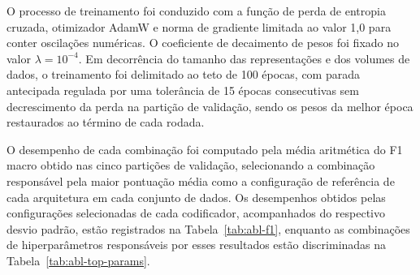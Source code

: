 O processo de treinamento foi conduzido com a função de perda de entropia cruzada, otimizador AdamW e norma de gradiente limitada ao valor 1,0 para conter oscilações numéricas. O coeficiente de decaimento de pesos foi fixado no valor $\lambda = 10^{-4}$. Em decorrência do tamanho das representações e dos volumes de dados, o treinamento foi delimitado ao teto de 100 épocas, com parada antecipada regulada por uma tolerância de 15 épocas consecutivas sem decrescimento da perda na partição de validação, sendo os pesos da melhor época restaurados ao término de cada rodada.

\label{subsec:res-codificadores}
\label{subsec:res-top-selecionadas}
O desempenho de cada combinação foi computado pela média aritmética do F1 macro obtido nas cinco partições de validação, selecionando a combinação responsável pela maior pontuação média como a configuração de referência de cada arquitetura em cada conjunto de dados. Os desempenhos obtidos pelas configurações selecionadas de cada codificador, acompanhados do respectivo desvio padrão, estão registrados na Tabela~\ref{tab:abl-f1}, enquanto as combinações de hiperparâmetros responsáveis por esses resultados estão discriminadas na Tabela~\ref{tab:abl-top-params}.

\begin{table}[htb]
\centering
\caption{F1 macro (média $\pm$ desvio padrão entre as 5 partições de validação) da via topológica isolada, na melhor combinação de hiperparâmetros de cada modelo. Em negrito, o maior valor médio de cada conjunto de dados.}
\label{tab:abl-f1}
\small
{}
\end{table}

